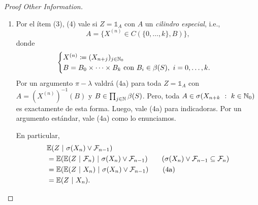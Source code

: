 \begin{proof}[Proof Other Information]
\begin{enumerate}
		\item Por el ítem (3), (4) vale si $Z = \mathds{1}_{A}$ con $A$ un \textit{cilindro especial}, i.e.,
		\[ A = \{X^{(n)} \in C(\{0,\dots,k\}, B)\}, \]
		donde 
		\[ \begin{cases}
			X^{(n)} \coloneq (X_{n+j})_{j \in \mathbb{N}_{0}} \\
			B = B_{0} \times \cdots \times B_{k} \text{ con } B_{i} \in \beta(S),\ i = 0,\dots,k.
		\end{cases} \]
		Por un argumento $\pi - \lambda$ valdrá (4a) para toda $Z = \mathds{1}_{A}$ con $A = (X^{(n)})^{-1}(B)$ y $B \in \prod_{j \in \mathbb{N}} \beta(S)$. Pero, toda $A \in \sigma(X_{n+k} \ : \ k \in \mathbb{N}_{0})$ es exactamente de esta forma. Luego, vale (4a) para indicadoras. Por un argumento estándar, vale (4a) como lo enunciamos. \par
		En particular,
		\begin{align*}
			&\mbb{E}(Z \ | \ \sigma(X_{n}) \vee \mcal{F}_{n-1}) \\
			&= \mbb{E}(\mbb{E}(Z \ | \ \mcal{F}_{n}) \ | \ \sigma(X_{n}) \vee \mcal{F}_{n-1}) \tag{$\sigma(X_{n}) \vee \mcal{F}_{n-1} \subseteq \mcal{F}_{n}$} \\
			&= \mbb{E}(\mbb{E}(Z \ | \ X_{n}) \ | \ \sigma(X_{n}) \vee \mcal{F}_{n-1}) \tag{4a} \\
			&= \mbb{E}(Z \ | \ X_{n})
		.\end{align*}
	\end{enumerate}
\end{proof}

